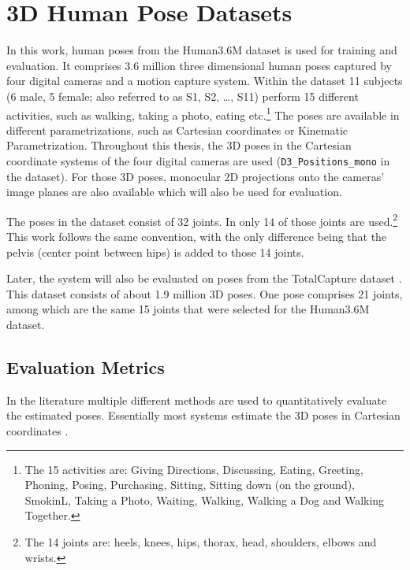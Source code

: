 \section{3D Human Pose Datasets}
\label{sec:data}
In this work, human poses from the Human3.6M dataset \cite{ionescu14} is used for training and evaluation.
It comprises 3.6 million three dimensional human poses captured by four digital cameras and a motion capture system.
Within the dataset 11 subjects (6 male, 5 female; also referred to as S1, S2, \dots, S11) perform 15 different activities, such as walking, taking a photo, eating etc.\footnote{
	The 15 activities are: Giving Directions, Discussing, Eating, Greeting, Phoning, Posing, Purchasing, Sitting, Sitting down (on the ground), SmokinL, Taking a Photo, Waiting, Walking, Walking a Dog and Walking Together.
}
The poses are available in different parametrizations, such as Cartesian coordinates or Kinematic Parametrization.
Throughout this thesis, the 3D poses in the Cartesian coordinate systems of the four digital cameras are used (\texttt{D3\_Positions\_mono} in the dataset).
For those 3D poses, monocular 2D projections onto the cameras' image planes are also available which will also be used for evaluation.

The poses in the dataset consist of 32 joints.
In \cite{drover18} only 14 of those joints are used.\footnote{
The 14 joints are: heels, knees, hips, thorax, head, shoulders, elbows and wrists.
}
This work follows the same convention, with the only difference being that the pelvis (center point between hips) is added to those 14 joints.

Later, the system will also be evaluated on poses from the TotalCapture dataset \cite{trumble17}.
This dataset consists of about 1.9 million 3D poses.
One pose comprises 21 joints, among which are the same 15 joints that were selected for the Human3.6M dataset.

\subsection{Evaluation Metrics}
In the literature multiple different methods are used to quantitatively evaluate the estimated poses. 
Essentially most systems estimate the 3D poses in Cartesian coordinates \cite{drover18, chen17, bogo16, grinciunaite16, yasin16, wandt19, tome17, tekin16, tekin17, pavlakos17}.

